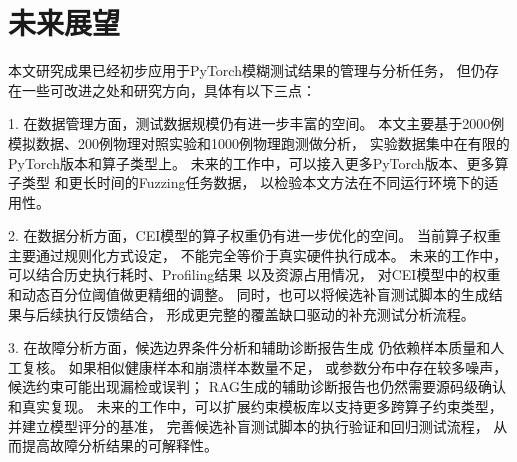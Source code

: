 \section*{未来展望}

本文研究成果已经初步应用于PyTorch模糊测试结果的管理与分析任务，
但仍存在一些可改进之处和研究方向，具体有以下三点：

1. 在数据管理方面，测试数据规模仍有进一步丰富的空间。
本文主要基于2000例模拟数据、200例物理对照实验和1000例物理跑测做分析，
实验数据集中在有限的PyTorch版本和算子类型上。
未来的工作中，可以接入更多PyTorch版本、更多算子类型
和更长时间的Fuzzing任务数据，
以检验本文方法在不同运行环境下的适用性。

2. 在数据分析方面，CEI模型的算子权重仍有进一步优化的空间。
当前算子权重主要通过规则化方式设定，
不能完全等价于真实硬件执行成本。
未来的工作中，可以结合历史执行耗时、Profiling结果
以及资源占用情况，
对CEI模型中的权重和动态百分位阈值做更精细的调整。
同时，也可以将候选补盲测试脚本的生成结果与后续执行反馈结合，
形成更完整的覆盖缺口驱动的补充测试分析流程。

3. 在故障分析方面，候选边界条件分析和辅助诊断报告生成
仍依赖样本质量和人工复核。
如果相似健康样本和崩溃样本数量不足，
或参数分布中存在较多噪声，
候选约束可能出现漏检或误判；
RAG生成的辅助诊断报告也仍然需要源码级确认和真实复现。
未来的工作中，可以扩展约束模板库以支持更多跨算子约束类型，
并建立模型评分的基准，
完善候选补盲测试脚本的执行验证和回归测试流程，
从而提高故障分析结果的可解释性。
